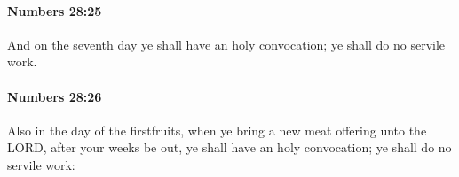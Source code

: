 		\paragraph{Numbers 28:25} %
			\label{NUMBERS-28-25}

			And on the seventh day ye shall have an holy convocation; ye shall do no servile work.


		\paragraph{Numbers 28:26} %
			\label{NUMBERS-28-26}

			Also in the day of the firstfruits, when ye bring a new meat offering unto the LORD, after your weeks be out, ye shall have an holy convocation; ye shall do no servile work:


